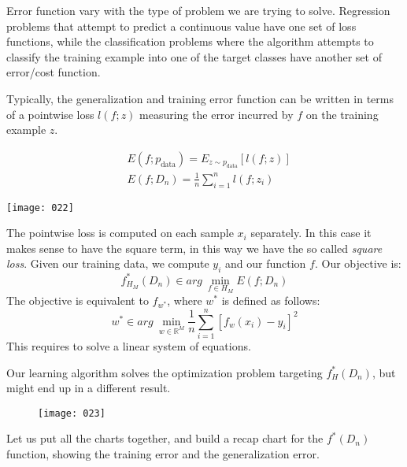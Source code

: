 Error function vary with the type of problem we are trying to solve. Regression problems that attempt to predict a continuous value have one set of loss functions, while the classification problems where the algorithm attempts to classify the training example into one of the target classes have another set of error/cost function.

Typically, the generalization and training error function can be written in terms of a pointwise loss \(l(f; z)\) measuring the error incurred by \(f\) on the training example \(z\).

\begin{align}
    &E(f; p_{\text{data}}) = E_{z \sim p_{\text{data}}}[l(f;z)]\\
    &E(f;D_n) = \frac 1 n \sum^n_{i=1}l(f;z_i)
\end{align}

\begin{figure}[h]

\label{fig:022}
\end{figure}
\begin{example}
\begin{center}
    \texttt{[image: 022]}
\end{center}
The pointwise loss is computed on each sample \(x_i\) separately. In this case it makes sense to have the square term, in this way we have the so called \emph{square loss}. Given our training data, we compute \(y_i\) and our function \(f\). Our objective is:
\[f^*_{H_M}(D_n) \in arg\ \min_{f \in H_M} E(f;D_n)\]
The objective is equivalent to \(f_{w^*}\), where \(w^*\) is defined as follows:
\[w^* \in arg\ \min_{w \in \mathbb{R}^M} \frac 1 n \sum^n_{i=1} [f_w(x_i)-y_i]^2\]
This requires to solve a linear system of equations.

\end{example}

Our learning algorithm solves the optimization problem targeting \(f_H^*(D_n)\), but might end up in a different result.
\begin{figure}[h]
\begin{center}
    \texttt{[image: 023]}
    \caption{}
    \label{fig:023}
\end{center}
\end{figure}

Let us put all the charts together, and build a recap chart for the \(f^*(D_n)\) function, showing the training error and the generalization error.

